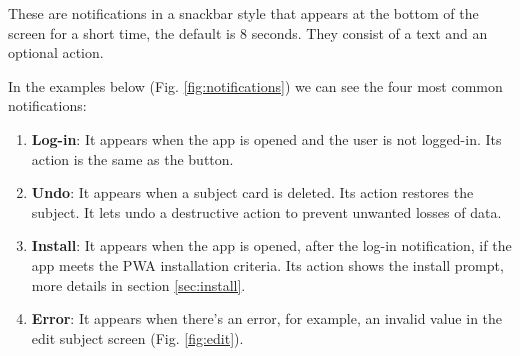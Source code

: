 These are notifications in a snackbar\cite{snackbar} style that appears at the bottom of the screen for a short time, the default is 8 seconds. They consist of a text and an optional action. 

In the examples below (Fig. \ref{fig:notifications}) we can see the four most common notifications:
\begin{enumerate}[label=\textbf{(\alph*)},itemsep=0mm]
    \item \textbf{Log-in}: It appears when the app is opened and the user is not logged-in. Its action is the same as the  button.
    \item \textbf{Undo}: It appears when a subject card is deleted. Its action restores the subject. It lets undo a destructive action to prevent unwanted losses of data.
    \item \textbf{Install}: It appears when the app is opened, after the log-in notification, if the app meets the PWA installation criteria\cite{pwa-install-criteria}. Its action shows the install prompt, more details in section \ref{sec:install}.
    \item \textbf{Error}: It appears when there's an error, for example, an invalid value in the edit subject screen (Fig. \ref{fig:edit}).
\end{enumerate}


